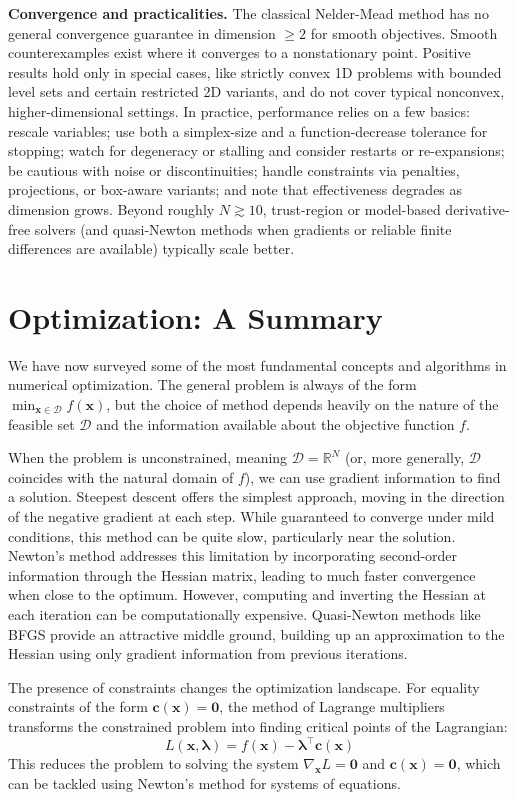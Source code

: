 \textbf{Convergence and practicalities.}\quad
The classical Nelder-Mead method has no general convergence guarantee in dimension $\ge 2$ for smooth objectives. Smooth counterexamples exist where it converges to a nonstationary point. Positive results hold only in special cases, like strictly convex 1D problems with bounded level sets and certain restricted 2D variants, and do not cover typical nonconvex, higher-dimensional settings. In practice, performance relies on a few basics: rescale variables; use both a simplex-size and a function-decrease tolerance for stopping; watch for degeneracy or stalling and consider restarts or re-expansions; be cautious with noise or discontinuities; handle constraints via penalties, projections, or box-aware variants; and note that effectiveness degrades as dimension grows. Beyond roughly $N\gtrsim 10$, trust-region or model-based derivative-free solvers (and quasi-Newton methods when gradients or reliable finite differences are available) typically scale better.

\section{Optimization: A Summary}

We have now surveyed some of the most fundamental concepts and algorithms in numerical optimization. The general problem is always of the form $\min_{\mathbf{x} \in \mathcal{D}} f(\mathbf{x})$, but the choice of method depends heavily on the nature of the feasible set $\mathcal{D}$ and the information available about the objective function $f$.

When the problem is unconstrained, meaning $\mathcal{D} = \mathbb{R}^N$ (or, more generally, $\mathcal{D}$ coincides with the natural domain of $f$), we can use gradient information to find a solution. Steepest descent offers the simplest approach, moving in the direction of the negative gradient at each step. While guaranteed to converge under mild conditions, this method can be quite slow, particularly near the solution. Newton's method addresses this limitation by incorporating second-order information through the Hessian matrix, leading to much faster convergence when close to the optimum. However, computing and inverting the Hessian at each iteration can be computationally expensive. Quasi-Newton methods like BFGS provide an attractive middle ground, building up an approximation to the Hessian using only gradient information from previous iterations.

The presence of constraints changes the optimization landscape. For equality constraints of the form $\mathbf{c}(\mathbf{x}) = \mathbf{0}$, the method of Lagrange multipliers transforms the constrained problem into finding critical points of the Lagrangian:
\begin{equation}
    L(\mathbf{x}, \boldsymbol{\lambda}) = f(\mathbf{x}) - \boldsymbol{\lambda}^\top \mathbf{c}(\mathbf{x})
\end{equation}
This reduces the problem to solving the system $\nabla_{\mathbf{x}} L = \mathbf{0}$ and $\mathbf{c}(\mathbf{x}) = \mathbf{0}$, which can be tackled using Newton's method for systems of equations.

